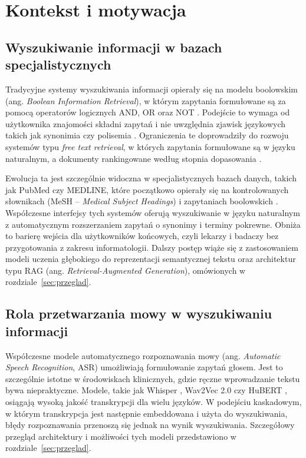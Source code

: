 \section{Kontekst i motywacja}

\subsection{Wyszukiwanie informacji w bazach specjalistycznych}

Tradycyjne systemy wyszukiwania informacji opierały się na modelu boolowskim (ang. \textit{Boolean Information Retrieval}), w którym zapytania formułowane są za pomocą operatorów logicznych AND, OR oraz NOT \cite{salton1983introduction}. Podejście to wymaga od użytkownika znajomości składni zapytań i nie uwzględnia zjawisk językowych takich jak synonimia czy polisemia \cite{manning2008introduction}. Ograniczenia te doprowadziły do rozwoju systemów typu \textit{free text retrieval}, w których zapytania formułowane są w języku naturalnym, a dokumenty rankingowane według stopnia dopasowania \cite{robertson2009probabilistic}.

Ewolucja ta jest szczególnie widoczna w specjalistycznych bazach danych, takich jak PubMed czy MEDLINE, które początkowo opierały się na kontrolowanych słownikach (MeSH -- \textit{Medical Subject Headings}) i zapytaniach boolowskich \cite{lu2011pubmed}. Współczesne interfejsy tych systemów oferują wyszukiwanie w języku naturalnym z automatycznym rozszerzaniem zapytań o synonimy i terminy pokrewne. Obniża to barierę wejścia dla użytkowników końcowych, czyli lekarzy i badaczy bez przygotowania z zakresu informatologii. Dalszy postęp wiąże się z zastosowaniem modeli uczenia głębokiego do reprezentacji semantycznej tekstu oraz architektur typu RAG (ang. \textit{Retrieval-Augmented Generation}), omówionych w rozdziale~\ref{sec:przeglad}.

\subsection{Rola przetwarzania mowy w wyszukiwaniu informacji}

Współczesne modele automatycznego rozpoznawania mowy (ang. \textit{Automatic Speech Recognition}, ASR) umożliwiają formułowanie zapytań głosem. Jest to szczególnie istotne w środowiskach klinicznych, gdzie ręczne wprowadzanie tekstu bywa niepraktyczne. Modele, takie jak Whisper \cite{whisper}, Wav2Vec 2.0 \cite{baevski2020wav2vec} czy HuBERT \cite{hsu2021hubert}, osiągają wysoką jakość transkrypcji dla wielu języków. W podejściu kaskadowym, w którym transkrypcja jest następnie embeddowana i użyta do wyszukiwania, błędy rozpoznawania przenoszą się jednak na wynik wyszukiwania. Szczegółowy przegląd architektury i możliwości tych modeli przedstawiono w rozdziale~\ref{sec:przeglad}.

